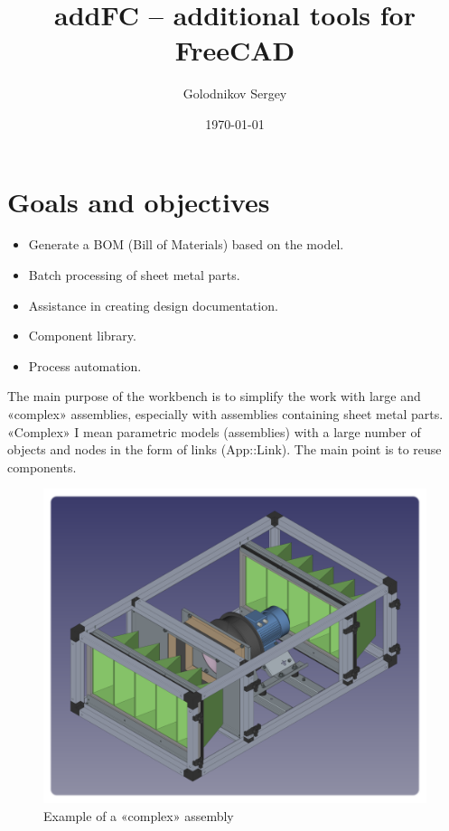 \documentclass[a4paper,12pt]{article}
\title{addFC -- additional tools for FreeCAD}
\author{Golodnikov Sergey}
\date{\today}
\begin{document}
\maketitle




\section{Goals and objectives}

\begin{itemize}
	\item Generate a BOM (Bill of Materials) based on the model.
	\item Batch processing of sheet metal parts.
	\item Assistance in creating design documentation.
	\item Component library.
	\item Process automation.\\
\end{itemize}

The main purpose of the workbench is to simplify the work with large and «complex» assemblies, especially with assemblies containing sheet metal parts. «Complex» I mean parametric models (assemblies) with a large number of objects and nodes in the form of links (App::Link). The main point is to reuse components.

\begin{figure}[htp]
	\centering
	\includegraphics[scale=0.46]{img/assembly_example.png}
	\caption{Example of a «complex» assembly}
	\label{sec:assembly_example}
\end{figure}
\end{document}
